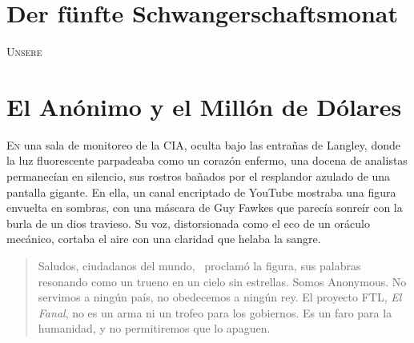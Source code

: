 

\chapter*{Der fünfte Schwangerschaftsmonat}
\lettrine[lines=2, loversize=0.3, lraise=0]{\initfamily U}{nsere}

\chapter{El Anónimo y el Millón de Dólares}

\lettrine[lines=2, loversize=0.3, lraise=0]{E}{n} una sala de monitoreo de la CIA, oculta bajo las entrañas de Langley, donde la luz fluorescente parpadeaba como un corazón enfermo, una docena de analistas permanecían en silencio, sus rostros bañados por el resplandor azulado de una pantalla gigante. En ella, un canal encriptado de YouTube mostraba una figura envuelta en sombras, con una máscara de Guy Fawkes que parecía sonreír con la burla de un dios travieso. Su voz, distorsionada como el eco de un oráculo mecánico, cortaba el aire con una claridad que helaba la sangre.

\begin{quote}
\calli
\glqq Saludos, ciudadanos del mundo,\grqq~ proclamó la figura, sus palabras resonando como un trueno en un cielo sin estrellas. \glqq Somos Anonymous. No servimos a ningún país, no obedecemos a ningún rey. El proyecto FTL, \emph{El Fanal}, no es un arma ni un trofeo para los gobiernos. Es un faro para la humanidad, y no permitiremos que lo apaguen.\grqq
\end{quote}

